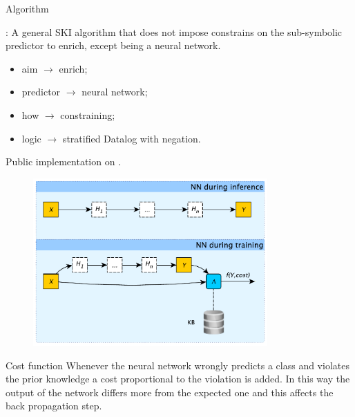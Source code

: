 \documentclass[presentation]{beamer}\mode<presentation>{\usetheme{AMSBolognaFC}}
\begin{document}
\begin{frame}[allowframebreaks]{Algorithm}
    \begin{block}{\killshort: \killlong}
        A general SKI algorithm that does not impose constrains on the sub-symbolic predictor to enrich, except being a neural network.
        \begin{itemize}
            \item aim $\rightarrow$ enrich;
            \item predictor $\rightarrow$ neural network;
            \item how $\rightarrow$ constraining;
            \item logic $\rightarrow$ stratified Datalog with negation.
        \end{itemize}
    \end{block}
    Public implementation on \psyki. 
    
    \framebreak
    
    \begin{figure}
        \centering
        \includegraphics[width=0.8\textwidth]{figures/lambda-layer.pdf}
    \end{figure}
    
    \framebreak
    
    
    
    \framebreak

    \begin{block}{Cost function}
        Whenever the neural network wrongly predicts a class and violates the prior knowledge a cost proportional to the violation is added.
        In this way the output of the network differs more from the expected one and this affects the back propagation step.
    \end{block}


\end{frame}
\end{document}
